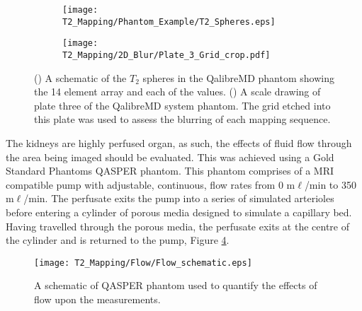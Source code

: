 \begin{figure}[H]
\centering
\begin{subfigure}[c]{0.47\textwidth}
	\centering
	\texttt{[image: T2\_Mapping/Phantom\_Example/T2\_Spheres.eps]}
	\caption{}
	\label{fig:t2_phantom_schematic}
\end{subfigure}
\hfill
\begin{subfigure}[c]{0.47\textwidth}
	\centering
	\texttt{[image: T2\_Mapping/2D\_Blur/Plate\_3\_Grid\_crop.pdf]}
	\caption{}
	\label{fig:t2_blur_grid}
\end{subfigure}
\caption{() A schematic of the $T_2$ spheres in the QalibreMD phantom showing the 14 element \ttwo array and each of the \ttwo values. () A scale drawing of plate three of the QalibreMD system phantom. The grid etched into this plate was used to assess the blurring of each \ttwo mapping sequence.}
\label{fig:t2_nist_phantom}
\end{figure}

The kidneys are highly perfused organ, as such, the effects of fluid flow through the area being imaged should be evaluated. This was achieved using a Gold Standard Phantoms \ac{QASPER} phantom. This phantom comprises of a \ac{MRI} compatible pump with adjustable, continuous, flow rates from 0 m$\ell$/min to 350 m$\ell$/min. The perfusate exits the pump into a series of simulated arterioles before entering a cylinder of porous media designed to simulate a capillary bed. Having travelled through the porous media, the perfusate exits at the centre of the cylinder and is returned to the pump, Figure \ref{fig:t2_flow_phantom_schematic}. 

\begin{figure}[H]
	\centering
	\texttt{[image: T2\_Mapping/Flow/Flow\_schematic.eps]}
	\caption{A schematic of \ac{QASPER} phantom used to quantify the effects of flow upon the \ttwo measurements.}
	\label{fig:t2_flow_phantom_schematic}	
\end{figure}

